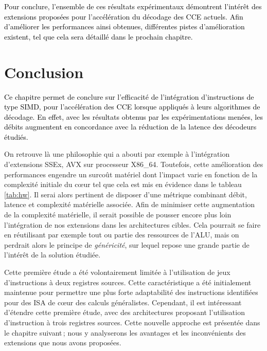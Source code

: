 \documentclass[../main.tex]{subfiles}
\begin{document}
\textcolor{black}{Pour conclure, l'ensemble de ces résultats expérimentaux démontrent l'intérêt des extensions proposées pour l'accélération du décodage des CCE actuels. 
Afin d'améliorer les performances ainsi obtenues, différentes pistes d'amélioration existent, tel que cela sera détaillé dans le prochain chapitre.}



%
%
%
%
\section{Conclusion}
%
%
%
%
\textcolor{black}{Ce chapitre permet de conclure sur l'efficacité de l'intégration d'instructions de type SIMD, pour l'accélération des CCE lorsque appliqués à leurs algorithmes de décodage. 
En effet, avec les résultats obtenus par les expérimentations menées, les débits augmentent en concordance avec la réduction de la latence des décodeurs étudiés.}

On retrouve là une philosophie qui a abouti par exemple à l'intégration d'extensions SSEx, AVX sur processeur X86\_64. 
Toutefois, cette amélioration des performances engendre un surcoût matériel dont l'impact varie en fonction de la complexité initiale du cœur tel que cela est mis en évidence dans le tableau \ref{tab:hw}. Il serai 
alors pertinent de disposer d'une métrique combinant débit, latence et complexité matérielle associée. 
Afin de minimiser cette augmentation de la complexité matérielle, il serait possible de pousser encore plus loin l'intégration de nos extensions dans les architectures cibles. 
Cela pourrait se faire en réutilisant par exemple tout ou partie des ressources de l'ALU, mais on perdrait alors le principe de \textit{généricité}, sur lequel repose une grande partie de l'intérêt de la solution étudiée.

Cette première étude a été volontairement limitée à l'utilisation de jeux d'instructions à deux registres sources. 
Cette caractéristique a été initialement maintenue pour permettre une plus forte adaptabilité des instructions identifiées pour des ISA de cœur des calculs généralistes. 
Cependant, il est intéressant d'étendre cette première étude, avec des architectures proposant l'utilisation d'instruction à trois registres sources. 
Cette nouvelle approche est présentée dans le chapitre suivant ; nous y analyserons les avantages et les inconvénients des extensions que nous avons proposées.
\end{document}
